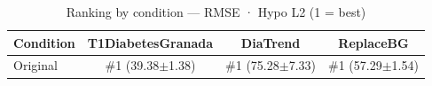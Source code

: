 \begin{table}[htbp]
\centering
\small
\caption{Ranking by condition — RMSE · Hypo L2  (1 = best)}
\label{tab:ranking_rmse_tbr_2_family_mechanism_baseline}
\begin{tabular}{lccc}
\toprule
\textbf{Condition} & \textbf{T1DiabetesGranada} & \textbf{DiaTrend} & \textbf{ReplaceBG} \\
\midrule
Original & \#1 (39.38$\pm$1.38) & \#1 (75.28$\pm$7.33) & \#1 (57.29$\pm$1.54) \\
\bottomrule
\end{tabular}
\end{table}